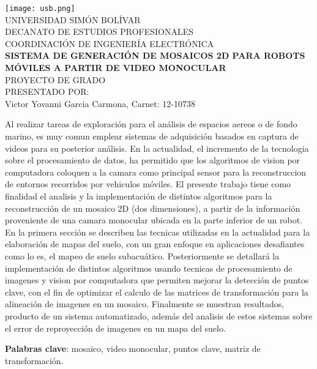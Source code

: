 \begin{titlepage}
    \begin{center}

        \texttt{[image: usb.png]} \\
        \textsc {\large UNIVERSIDAD SIMÓN BOLÍVAR} \\
        \textsc{DECANATO DE ESTUDIOS PROFESIONALES\\
        COORDINACIÓN DE INGENIERÍA ELECTRÓNICA}\\
        \textbf{SISTEMA DE GENERACIÓN DE MOSAICOS 2D PARA ROBOTS MÓVILES A PARTIR DE VIDEO MONOCULAR} \\
        PROYECTO DE GRADO \\
        PRESENTADO POR: \\
        Victor Yovanni Garcia Carmona, Carnet: 12-10738

    \end{center}
\abstract
{
    Al realizar tareas de exploración para el análisis de espacios aereos o de fondo marino, es muy comun emplear sistemas de adquisición basados en captura de videos para su posterior análisis. En la actualidad, el incremento de la tecnologia sobre el procesamiento de datos, ha permitido que los algoritmos de vision por computadora coloquen a la camara como principal sensor para la reconstruccion de entornos recorridos por vehiculos móviles. El presente trabajo tiene como finalidad el analisis y la implementación de distintos algoritmos para la reconstrucción de un mosaico 2D (dos dimensiones), a partir de la información proveniente de una camara monocular ubicada en la parte inferior de un robot. En la primera sección se describen las tecnicas utilizadas en la actualidad para la elaboración de mapas del suelo, con un gran enfoque en aplicaciones desafiantes como lo es, el mapeo de suelo subacuático. Posteriormente se detallará la implementación de distintos algoritmos usando tecnicas de procesamiento de imagenes y vision por computadora que permiten mejorar la detección de puntos clave, con el fin de optimizar el calculo de las matrices de transformación para la alineación de imagenes en un mosaico. Finalmente se muestran resultados, producto de un sistema automatizado, además del analisis de estos sistemas sobre el error de reproyección de imagenes en un mapa del suelo.
    
}

\noindent \begin{small} \textbf{Palabras clave}: mosaico, video monocular, puntos clave, matriz de transformación. 
\end{small}
	
\clearpage
{}

\end{titlepage}